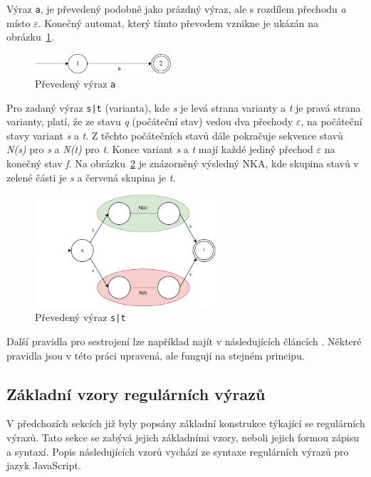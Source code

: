 Výraz \texttt{a}, je převedený podobně jako prázdný výraz, ale s rozdílem přechodu \textit{a} místo \textit{$\varepsilon$}.
Konečný automat, který tímto převodem vznikne je ukázán na obrázku~\ref{fig:NFAa}.
\begin{figure}[!h]
	\centering
	\includegraphics[width=0.45\textwidth]{Figures/NFA_a.pdf}
	\caption{Převedený výraz \texttt{a}}
	\label{fig:NFAa}
\end{figure}

Pro zadaný výraz \texttt{s|t} (varianta), kde \textit{s} je levá strana varianty a \textit{t} je pravá strana varianty, platí, že ze stavu \textit{q} (počáteční stav) vedou dva přechody
\textit{$\varepsilon$}, na počáteční stavy variant \textit{s} a \textit{t}. 
Z těchto počátečních stavů dále pokračuje sekvence stavů \textit{N(s)} pro \textit{s} a \textit{N(t)} pro \textit{t}.
Konce variant \textit{s} a \textit{t} mají každé jediný přechod \textit{$\varepsilon$} na konečný stav \textit{f}.
Na obrázku~\ref{fig:NFAunion} je znázorněný výsledný NKA, kde skupina stavů v zelené části je \textit{s} a červená skupina je \textit{t}.
\begin{figure}[!h]
	\centering
	\includegraphics[width=0.6\textwidth]{Figures/NFA_union.pdf}
	\caption{Převedený výraz \texttt{s|t}}
	\label{fig:NFAunion}
\end{figure}

Další pravidla pro sestrojení lze například najít v následujících článcích \cite{Thompson1,Thompson2}.
Některé pravidla jsou v této práci upravená, ale fungují na stejném principu.

\subsection*{Základní vzory regulárních výrazů}
V předchozích sekcích již byly popsány základní konstrukce týkající se regulárních výrazů.
Tato sekce se zabývá jejich základními vzory, neboli jejich formou zápisu a syntaxí.
Popis následujících vzorů vychází ze syntaxe regulárních výrazů pro jazyk JavaScript.

